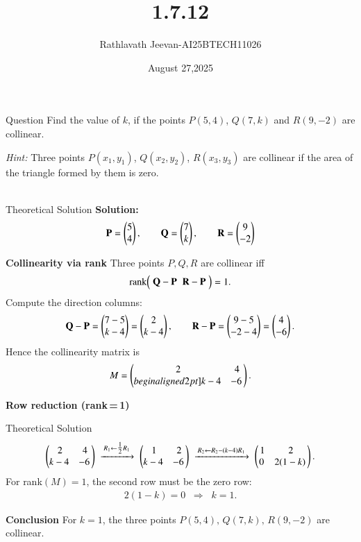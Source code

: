 \documentclass{beamer}
\title %
{1.7.12}
\date{August 27,2025}
\author %
{Rathlavath Jeevan-AI25BTECH11026}
\begin{document}
\frame{\titlepage}
\begin{frame}{Question}
\textbf{} Find the value of $k$, if the points $P(5,4)$, $Q(7,k)$ and $R(9,-2)$ are collinear. 

\textit{Hint:} Three points $P(x_1,y_1)$, $Q(x_2,y_2)$, $R(x_3,y_3)$ are collinear if the area of the triangle formed by them is zero.\\
\\
\end{frame}


\begin{frame}{Theoretical Solution}
\textbf{Solution:} \\
\begin{align}
\mathbf P=\begin{pmatrix}5\\4\end{pmatrix},\qquad
\mathbf Q=\begin{pmatrix}7\\k\end{pmatrix},\qquad
\mathbf R=\begin{pmatrix}9\\-2\end{pmatrix}
\end{align}

 \textbf{Collinearity via rank}
Three points \(P,Q,R\) are collinear iff
\begin{align}
\operatorname{rank}\!\begin{pmatrix}\; \mathbf Q-\mathbf P \;\; \mathbf R-\mathbf P \;\end{pmatrix}=1.
\end{align}
Compute the direction columns:
\begin{align}
\mathbf Q-\mathbf P=\begin{pmatrix}7-5\\k-4\end{pmatrix}=\begin{pmatrix}2\\k-4\end{pmatrix},\qquad
\mathbf R-\mathbf P=\begin{pmatrix}9-5\\-2-4\end{pmatrix}=\begin{pmatrix}4\\-6\end{pmatrix}.
\end{align}
Hence the collinearity matrix is
\begin{align}
M=\begin{pmatrix}\,2 & 4\\begin{align}2pt] k-4 & -6\,\end{pmatrix}.
\end{align}

\textbf{Row reduction (rank\,=\,1)}
\end{frame}
\begin{frame}{Theoretical Solution}
\begin{align}
\begin{pmatrix}\,2 & 4\\ k-4 & -6\,\end{pmatrix}
\;\xrightarrow{\,R_1\leftarrow \tfrac12 R_1\,}\;
\begin{pmatrix}\,1 & 2\\k-4 & -6\,\end{pmatrix}
\;\xrightarrow{\,R_2\leftarrow R_2-(k-4)R_1\,}\;
\begin{pmatrix}\,1 & 2\\0 & 2(1-k)\,\end{pmatrix}.
\end{align}
For rank\((M)=1\), the second row must be the zero row:
\begin{align}
2(1-k)=0 \;\;\Rightarrow\;\; k=1.
\end{align}

\textbf{Conclusion}
For \(k=\boxed{1}\), the three points \(P(5,4),\,Q(7,k),\,R(9,-2)\) are collinear.


\end{frame}
\end{document}
